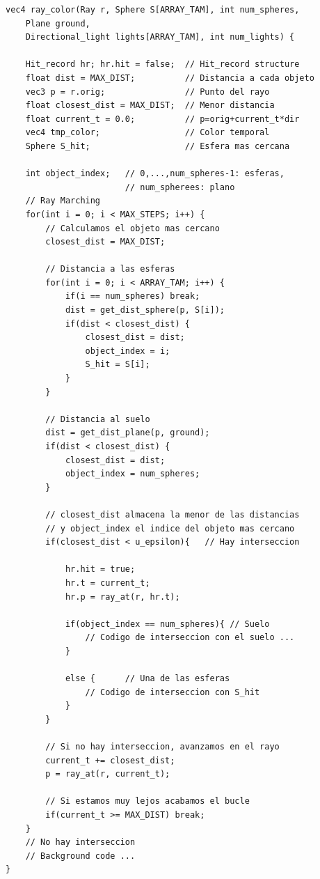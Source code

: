 \begin{lstlisting}
vec4 ray_color(Ray r, Sphere S[ARRAY_TAM], int num_spheres, 
    Plane ground,
    Directional_light lights[ARRAY_TAM], int num_lights) {
    
    Hit_record hr; hr.hit = false;  // Hit_record structure
    float dist = MAX_DIST;          // Distancia a cada objeto 
    vec3 p = r.orig;                // Punto del rayo
    float closest_dist = MAX_DIST;  // Menor distancia
    float current_t = 0.0;          // p=orig+current_t*dir
    vec4 tmp_color;                 // Color temporal
    Sphere S_hit;                   // Esfera mas cercana
    
    int object_index;   // 0,...,num_spheres-1: esferas,
                        // num_spherees: plano
    // Ray Marching
    for(int i = 0; i < MAX_STEPS; i++) {
        // Calculamos el objeto mas cercano
        closest_dist = MAX_DIST;

        // Distancia a las esferas
        for(int i = 0; i < ARRAY_TAM; i++) {
            if(i == num_spheres) break;
            dist = get_dist_sphere(p, S[i]);
            if(dist < closest_dist) {
                closest_dist = dist;
                object_index = i;
                S_hit = S[i];
            }
        }

        // Distancia al suelo
        dist = get_dist_plane(p, ground);
        if(dist < closest_dist) {
            closest_dist = dist;
            object_index = num_spheres;
        }
    
        // closest_dist almacena la menor de las distancias
        // y object_index el indice del objeto mas cercano
        if(closest_dist < u_epsilon){   // Hay interseccion

            hr.hit = true;
            hr.t = current_t;
            hr.p = ray_at(r, hr.t);

            if(object_index == num_spheres){ // Suelo
                // Codigo de interseccion con el suelo ...
            }

            else {      // Una de las esferas
                // Codigo de interseccion con S_hit
            }
        }

        // Si no hay interseccion, avanzamos en el rayo
        current_t += closest_dist;
        p = ray_at(r, current_t);

        // Si estamos muy lejos acabamos el bucle
        if(current_t >= MAX_DIST) break;
    }
    // No hay interseccion
    // Background code ...       
}
\end{lstlisting}

